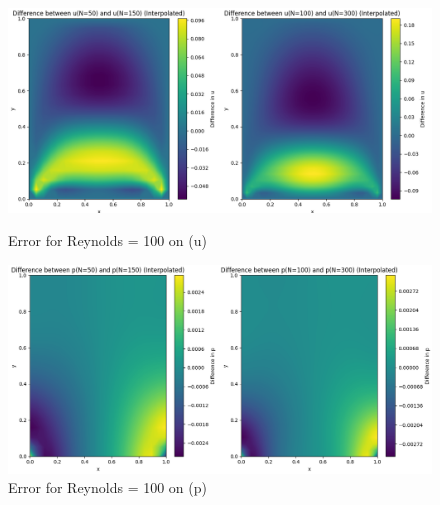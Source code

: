 \documentclass{article}
\begin{document}
\begin{figure}[h!]
  \centering
  \begin{minipage}{0.49\textwidth}
    \centering
    \includegraphics[width=\textwidth]{udiff100.png}
    \caption{Error for Reynolds = 100 on (u)}
  \end{minipage}
  \hfill
  \begin{minipage}{0.49\textwidth}
    \centering
    \includegraphics[width=\textwidth]{pdiff100.png}
    \caption{Error for Reynolds = 100 on (p)}
  \end{minipage}
\end{figure}
\end{document}

